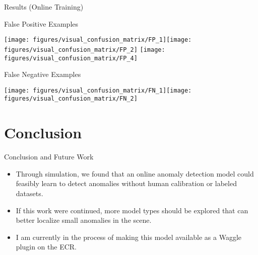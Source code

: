 \documentclass[10pt,handout]{beamer}
\begin{document}
\begin{frame}{Results (Online Training)}

\begin{exampleblock}{False Positive Examples}

\texttt{[image: figures/visual\_confusion\_matrix/FP\_1]}\texttt{[image: figures/visual\_confusion\_matrix/FP\_2]} \texttt{[image: figures/visual\_confusion\_matrix/FP\_4]}

\end{exampleblock}

\begin{exampleblock}{False Negative Examples}

\texttt{[image: figures/visual\_confusion\_matrix/FN\_1]}\texttt{[image: figures/visual\_confusion\_matrix/FN\_2]}

\end{exampleblock}

\end{frame}

\section{Conclusion}
\begin{frame}{Conclusion and Future Work}
\begin{itemize}

\item Through simulation, we found that an online anomaly detection model could feasibly learn to detect anomalies without human calibration or labeled datasets.\\[2mm]

\item If this work were continued, more model types should be explored that can better localize small anomalies in the scene.\\[2mm]

\item I am currently in the process of making this model available as a Waggle plugin on the ECR.

\end{itemize}
\end{frame}

%
%
%
%
%
%
%
%
\end{document}
